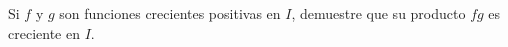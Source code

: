 \item Si $f$ y $g$ son funciones crecientes positivas en $I$, demuestre que su producto $fg$ es creciente en $I$.
